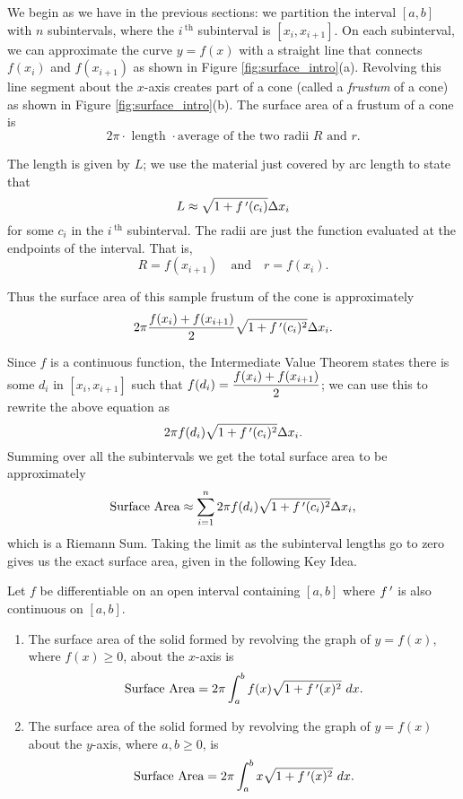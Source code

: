 We begin as we have in the previous sections: we partition the interval $[a,b]$ with $n$ subintervals, where the $i\,^{\text{th}}$ subinterval is $[x_i,x_{i+1}]$. On each subinterval, we can approximate the curve $y=f(x)$ with a straight line that connects $f(x_i)$ and $f(x_{i+1})$ as shown in Figure \ref{fig:surface_intro}(a). Revolving this line segment about the $x$-axis creates part of a cone (called a \textit{frustum} of a cone) as shown in Figure \ref{fig:surface_intro}(b). The surface area of a frustum of a cone is $$2\pi\cdot\text{ length }\cdot\text{average of the two radii $R$ and $r$}.$$

The length is given by $L$; we use the material just covered by arc length to state that $$L\approx \sqrt{1+f\,'(c_i)}\Delta x_i$$ for some $c_i$ in the $i\,^\text{th}$ subinterval. The radii are just the function evaluated at the endpoints of the interval. That is, $$R = f(x_{i+1})\quad \text{and}\quad r = f(x_i).$$

Thus the surface area of this sample frustum of the cone is approximately 
$$2\pi\frac{f(x_i)+f(x_{i+1})}2\sqrt{1+f\,'(c_i)^2}\Delta x_i.$$

Since $f$ is a continuous function, the Intermediate Value Theorem states there is some $d_i$ in $[x_i,x_{i+1}]$ such that $\displaystyle f(d_i) = \frac{f(x_i)+f(x_{i+1})}2$; we can use this to rewrite the above equation as
$$2\pi f(d_i)\sqrt{1+f\,'(c_i)^2}\Delta x_i.$$
Summing over all the subintervals we get the total surface area to be approximately 
$$\text{Surface Area}\approx \sum_{i=1}^n 2\pi f(d_i)\sqrt{1+f\,'(c_i)^2}\Delta x_i,$$
which is a Riemann Sum. Taking the limit as the subinterval lengths go to zero gives us the exact surface area, given in the following Key Idea.

{Let $f$ be differentiable on an open interval containing $[a,b]$ where $f\,'$ is also continuous on $[a,b]$. 
	\begin{enumerate}
	\item	The surface area of the solid formed by revolving the graph of $y=f(x)$, where $f(x)\geq0$, about the $x$-axis is
	$$\text{Surface Area} = 2\pi\int_a^b f(x)\sqrt{1+f\,'(x)^2}\ dx.$$
	\item	The surface area of the solid formed by revolving the graph of $y=f(x)$ about the $y$-axis, where $a,b\geq0$, is
	$$\text{Surface Area} = 2\pi\int_a^b x\sqrt{1+f\,'(x)^2}\ dx.$$
	\end{enumerate}
}

